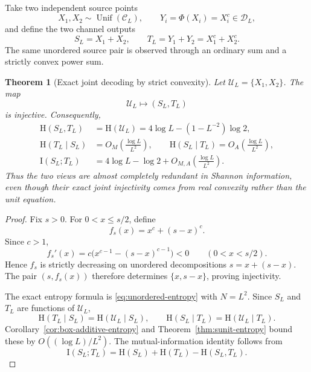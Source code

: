 \documentclass[11pt,oneside]{article}
\newtheorem{theorem}{Theorem}[section]
\theoremstyle{definition}
\theoremstyle{remark}
\newcommand{\HH}{\mathrm{H}}
\newcommand{\II}{\mathrm{I}}
\begin{document}
Take two independent source points
\[
 X_1,X_2\sim\operatorname{Unif}(\mathcal C_L),
 \qquad Y_i=\Phi(X_i)=X_i^c\in\mathcal D_L,
\]
and define the two channel outputs
\begin{equation}\label{eq:two-sums}
 S_L=X_1+X_2,
 \qquad T_L=Y_1+Y_2=X_1^c+X_2^c.
\end{equation}
The same unordered source pair is observed through an ordinary sum and a strictly convex power sum.

\begin{theorem}[Exact joint decoding by strict convexity]\label{thm:joint-sums}
Let \(\mathcal U_L=\{X_1,X_2\}\).  The map
\begin{equation}\label{eq:joint-map}
 \mathcal U_L\longmapsto(S_L,T_L)
\end{equation}
 is injective.  Consequently,
\begin{align}
 \HH(S_L,T_L)&=\HH(\mathcal U_L)
 =4\log L-\left(1-L^{-2}\right)\log2,
 \label{eq:joint-entropy-exact}\\
 \HH(T_L\mid S_L)&=O_M\!\left(\frac{\log L}{L^2}\right),
 \qquad
 \HH(S_L\mid T_L)=O_A\!\left(\frac{\log L}{L^2}\right),
 \label{eq:conditional-sums}\\
 \II(S_L;T_L)&=4\log L-\log2
 +O_{M,A}\!\left(\frac{\log L}{L^2}\right).
 \label{eq:mutual-sums}
\end{align}
Thus the two views are almost completely redundant in Shannon information, even though their exact joint injectivity comes from real convexity rather than the unit equation.
\end{theorem}

\begin{proof}
Fix \(s>0\).  For \(0<x\leq s/2\), define
\[
 f_s(x)=x^c+(s-x)^c.
\]
Since \(c>1\),
\[
 f_s'(x)=c\bigl(x^{c-1}-(s-x)^{c-1}\bigr)<0
 \qquad(0<x<s/2).
\]
Hence \(f_s\) is strictly decreasing on unordered decompositions \(s=x+(s-x)\).  The pair \((s,f_s(x))\) therefore determines \(\{x,s-x\}\), proving injectivity.

The exact entropy formula is \eqref{eq:unordered-entropy} with \(N=L^2\).  Since \(S_L\) and \(T_L\) are functions of \(\mathcal U_L\),
\[
 \HH(T_L\mid S_L)=\HH(\mathcal U_L\mid S_L),
 \qquad
 \HH(S_L\mid T_L)=\HH(\mathcal U_L\mid T_L).
\]
Corollary~\ref{cor:box-additive-entropy} and Theorem~\ref{thm:sunit-entropy} bound these by \(O((\log L)/L^2)\).  The mutual-information identity follows from
\[
 \II(S_L;T_L)=\HH(S_L)+\HH(T_L)-\HH(S_L,T_L).
\]
\end{proof}
\end{document}
